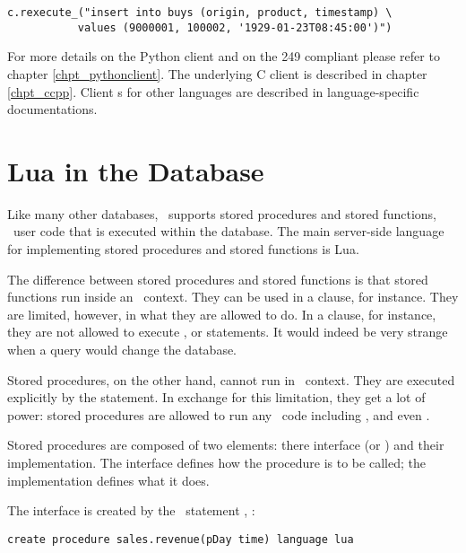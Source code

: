 \begin{minipage}{\textwidth}
\begin{python}
\begin{lstlisting}
c.rexecute_("insert into buys (origin, product, timestamp) \
           values (9000001, 100002, '1929-01-23T08:45:00')")
\end{lstlisting}
\end{python}
\end{minipage}

For more details on the Python client
and on the  249 compliant 
please refer to chapter \ref{chpt_pythonclient}.
The underlying C client \acronym{api} is described in
chapter \ref{chpt_ccpp}.
Client s for other languages are described
in language-specific documentations.

\section{Lua in the Database}
Like many other databases,
\nowdb\ supports
stored procedures and stored functions,
\ie\ user code that is executed within the database.
The main server-side language
for implementing stored procedures and
stored functions is Lua.

The difference between stored procedures
and stored functions is that stored functions
run inside an \sql\ context. They
can be used in a  clause,
for instance. They are limited, however,
in what they are allowed to do.
In a  clause, for instance,
they are not allowed to
execute ,  or 
statements.
It would indeed be very strange when
a query would change the database.

Stored procedures, on the other hand,
cannot run in \sql\ context. They are
executed explicitly by the 
statement. In exchange for this limitation,
they get a lot of power:
stored procedures are allowed to run
any \sql\ code including , 
and even .

Stored procedures are composed of two
elements: there interface (or )
and their implementation.
The interface defines how the procedure is
to be called; the implementation defines
what it does.

The interface is created by the \sql\ statement
, \eg:

\begin{sqlcode}
\begin{lstlisting}
create procedure sales.revenue(pDay time) language lua 
\end{lstlisting}
\end{sqlcode}

